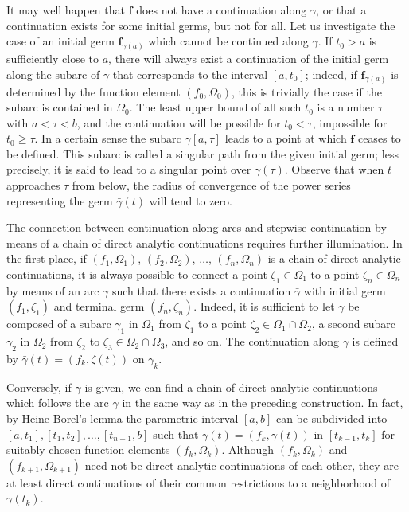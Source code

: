 It may well happen that $\mathbf{f}$ does not have a continuation along $\gamma$, or that a continuation exists for some initial germs, but not for all. Let us investigate the case of an initial germ $\mathbf{f}_{\gamma(a)}$ which cannot be continued along $\gamma$. If $t_0 > a$ is sufficiently close to $a$, there will always exist a continuation of the initial germ along the subarc of $\gamma$ that corresponds to the interval $[a, t_0]$; indeed, if $\mathbf{f}_{\gamma(a)}$ is determined by the function element $(f_0, \Omega_0)$, this is trivially the case if the subarc is contained in $\Omega_0$. The least upper bound of all such $t_0$ is a number $\tau$ with $a < \tau < b$, and the continuation will be possible for $t_0 < \tau$, impossible for $t_0 \geq \tau$. In a certain sense the subarc $\gamma[a, \tau]$ leads to a point at which $\mathbf{f}$ ceases to be defined. This subarc is called a singular path from the given initial germ; less precisely, it is said to lead to a singular point over $\gamma(\tau)$. Observe that when $t$ approaches $\tau$ from below, the radius of convergence of the power series representing the germ $\bar{\gamma}(t)$ will tend to zero.

The connection between continuation along arcs and stepwise continuation by means of a chain of direct analytic continuations requires further illumination. In the first place, if $(f_{1},\Omega_{1})$, $(f_{2},\Omega_{2})$, $\ldots$, $(f_{n},\Omega_{n})$ is a chain of direct analytic continuations, it is always possible to connect a point $\zeta_{1}\in\Omega_{1}$ to a point $\zeta_{n}\in\Omega_{n}$ by means of an arc $\gamma$ such that there exists a continuation $\bar{\gamma}$ with initial germ $(f_{1},\zeta_{1})$ and terminal germ $(f_{n},\zeta_{n})$. Indeed,
it is sufficient to let $\gamma$ be composed of a subarc $\gamma_{1}$ in $\Omega_{1}$ from $\zeta_{1}$ to a point $\zeta_{2} \in \Omega_{1} \cap \Omega_{2}$, a second subarc $\gamma_{2}$ in $\Omega_{2}$ from $\zeta_{2}$ to $\zeta_{3} \in \Omega_{2} \cap \Omega_{3}$, and so on. The continuation along $\gamma$ is defined by $\bar{\gamma}(t) = (f_{k}, \zeta(t))$ on $\gamma_{k}$.

Conversely, if $\bar{\gamma}$ is given, we can find a chain of direct analytic continuations which follows the arc $\gamma$ in the same way as in the preceding construction. In fact, by Heine-Borel's lemma the parametric interval $[a,b]$ can be subdivided into $[a,t_1],[t_1,t_2],\ldots,[t_{n-1},b]$ such that $\bar{\gamma}(t) = (f_k,\gamma(t))$ in $[t_{k-1},t_k]$ for suitably chosen function elements $(f_k,\Omega_k)$. Although $(f_k,\Omega_k)$ and $(f_{k+1},\Omega_{k+1})$ need not be direct analytic continuations of each other, they are at least direct continuations of their common restrictions to a neighborhood of $\gamma(t_k)$.

